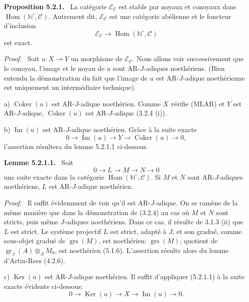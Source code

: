 \documentclass[11pt]{article}
\newenvironment{statement}[1]{\par\medskip\noindent\textbf{#1.}\ }{\par\medskip}
\newenvironment{prooftext}[1][Proof]{\par\noindent\emph{#1.}\ }{\par\medskip}
\DeclareMathOperator{\Hom}{Hom}
\providecommand{\Ker}{\operatorname{Ker}}
\providecommand{\Coker}{\operatorname{Coker}}
\providecommand{\gr}{\operatorname{gr}}
\providecommand{\Hom}{\operatorname{Hom}}
\providecommand{\Im}{\operatorname{Im}}
\providecommand{\Ker}{\operatorname{Ker}}
\providecommand{\Coker}{\operatorname{Coker}}
\providecommand{\gr}{\operatorname{gr}}
\renewcommand{\Im}{\operatorname{Im}}
\providecommand{\gr}{\operatorname{gr}}
\providecommand{\grs}{\operatorname{grs}}
\providecommand{\Ker}{\operatorname{Ker}}
\providecommand{\Coker}{\operatorname{Coker}}
\providecommand{\Im}{\operatorname{Im}}
\providecommand{\Hom}{\operatorname{Hom}}
\begin{document}
\begin{statement}{Proposition 5.2.1}
La catégorie \(\mathcal E_{\mathcal C}\) est stable par noyaux et conoyaux dans \(\Hom(\mathbb N^\circ,\mathcal C)\). Autrement dit, \(\mathcal E_{\mathcal C}\) est une catégorie abélienne et le foncteur d'inclusion
\[
\mathcal E_{\mathcal C}\longrightarrow \Hom(\mathbb N^\circ,\mathcal C)
\]
est exact.
\end{statement}

\begin{prooftext}
Soit \(u:X\to Y\) un morphisme de \(\mathcal E_{\mathcal C}\). Nous allons voir successivement que le conoyau, l'image et le noyau de \(u\) sont AR-\(J\)-adiques noethériens. (Bien entendu la démonstration du fait que l'image de \(u\) est AR-\(J\)-adique noethérienne est uniquement un intermédiaire technique).

a) \(\Coker(u)\) est AR-\(J\)-adique noethérien. Comme \(X\) vérifie (MLAR) et \(Y\) est AR-\(J\)-adique, \(\Coker(u)\) est AR-\(J\)-adique (3.2.4 (i)).

b) \(\Im(u)\) est AR-\(J\)-adique noethérien. Grâce à la suite exacte
\[
0\longrightarrow \Im(u)\longrightarrow Y\longrightarrow \Coker(u)\longrightarrow 0,
\]
l'assertion résultera du lemme 5.2.1.1 ci-dessous.
\end{prooftext}

\begin{statement}{Lemme 5.2.1.1}
Soit
\[
0\longrightarrow L\longrightarrow M\longrightarrow N\longrightarrow0
\]
une suite exacte dans la catégorie \(\Hom(\mathbb N^\circ,\mathcal C)\). Si \(M\) et \(N\) sont AR-\(J\)-adiques noethériens, \(L\) est AR-\(J\)-adique noethérien.
\end{statement}

\begin{prooftext}
Il suffit évidemment de voir qu'il est AR-\(J\)-adique. On se ramène de la même manière que dans la démonstration de (3.2.4) au cas où \(M\) et \(N\) sont stricts, puis même \(J\)-adiques noethériens. Dans ce cas, il résulte de 3.1.3 (ii) que \(L\) est strict. Le système projectif \(L\) est strict, adapté à \(J\), et son gradué, comme sous-objet gradué de \(\grs(M)\), est noethérien: \(\grs(M)\), quotient de \(\gr_J(A)\otimes_A M_0\), est noethérien (5.1.6). L'assertion résulte alors du lemme d'Artin-Rees (4.2.6).
\end{prooftext}

c) \(\Ker(u)\) est AR-\(J\)-adique noethérien. Il suffit d'appliquer (5.2.1.1) à la suite exacte évidente ci-dessous:
\[
0\longrightarrow \Ker(u)\longrightarrow X\longrightarrow \Im(u)\longrightarrow0.
\]
\end{document}
